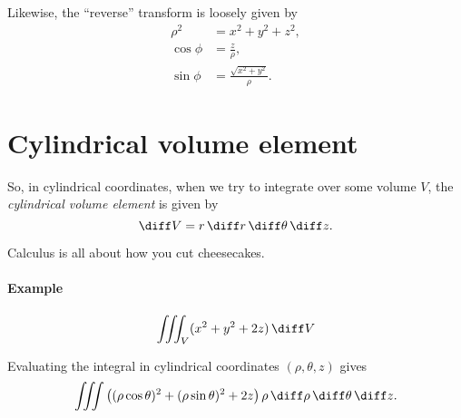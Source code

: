 \documentclass{multi}
\begin{document}
Likewise, the ``reverse'' transform is loosely given by
\begin{align*}
    \rho^2 &= x^2 + y^2 + z^2, \\
    \cos \phi &= \frac{z}{\rho}, \\
    \sin \phi &= \frac{\sqrt{x^2 + y^2}}{\rho}.
\end{align*}

\section*{Cylindrical volume element}

So, in cylindrical coordinates, when we try to integrate over some volume \(V\), the \emph{cylindrical volume element} is given by
\[
    \diff V = r \, \diff r \, \diff \theta \, \diff z.
\]

\begin{mdframed}
    Calculus is all about how you cut cheesecakes.
\end{mdframed}

\paragraph{Example}

\[
    \iiint_{V} (x^2 + y^2 + 2z) \, \diff V
\]

Evaluating the integral in cylindrical coordinates \((\rho, \theta, z)\) gives
\[
    \iiint \left((\rho \cos \theta)^2 + (\rho \sin \theta)^2 + 2z\right) \rho \, \diff \rho \, \diff \theta \, \diff z.
\]

\end{document}
